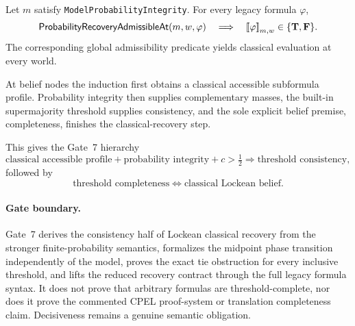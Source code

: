 \begin{theorem}
\label{thm:probability-integrity-formula-recovery}
Let \(m\) satisfy \texttt{ModelProbabilityIntegrity}.  For every legacy formula
\(\varphi\),
\[
  \mathsf{ProbabilityRecoveryAdmissibleAt}(m,w,\varphi)
  \quad\Longrightarrow\quad
  \mathopen{[\![}\varphi\mathclose{]\!]}_{m,w}\in\{\mathbf{T},\mathbf{F}\}.
\]
The corresponding global admissibility predicate yields classical evaluation at
every world.
\statusverified
\end{theorem}

At belief nodes the induction first obtains a classical accessible subformula
profile.  Probability integrity then supplies complementary masses, the built-in
supermajority threshold supplies consistency, and the sole explicit belief premise,
completeness, finishes the classical-recovery step.

This gives the Gate~7 hierarchy
\[
  \text{classical accessible profile}
  + \text{probability integrity}
  + c>\tfrac12
  \Longrightarrow
  \text{threshold consistency},
\]
followed by
\[
  \text{threshold completeness}
  \Longleftrightarrow
  \text{classical Lockean belief}.
\]

\paragraph{Gate boundary.}
Gate~7 derives the consistency half of Lockean classical recovery from the stronger
finite-probability semantics, formalizes the midpoint phase transition independently
of the model, proves the exact tie obstruction for every inclusive threshold, and
lifts the reduced recovery contract through the full legacy formula syntax.  It does
not prove that arbitrary formulas are threshold-complete, nor does it prove the
commented CPEL proof-system or translation completeness claim.  Decisiveness remains
a genuine semantic obligation.
